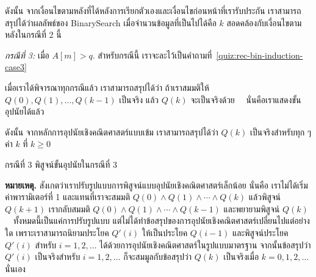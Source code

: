 ดังนั้น จาก{\wbr}เงื่อนไข{\wbr}ตาม{\wbr}หลัง{\wbr}ที่{\wbr}ได้{\wbr}หลัง{\wbr}การ{\wbr}เรียก{\wbr}ตัวเอง{\wbr}และ{\wbr}เงื่อนไข{\wbr}ก่อนหน้า{\wbr}ที่{\wbr}เรา{\wbr}รับประกัน{\wbr}
เรา{\wbr}สามารถ{\wbr}สรุป{\wbr}ได้{\wbr}ว่า{\wbr}ผลลัพธ์{\wbr}ของ BinarySearch เมื่อ{\wbr}จำนวน{\wbr}ข้อมูล{\wbr}ที่{\wbr}เป็น{\wbr}ไป{\wbr}ได้{\wbr}คือ $k$
สอดคล้อง{\wbr}กับ{\wbr}เงื่อนไข{\wbr}ตาม{\wbr}หลัง{\wbr}ใน{\wbr}กรณี{\wbr}ที่ 2 นี้{\wbr}

{\em กรณี{\wbr}ที่ 3:} เมื่อ $A[m]>q$. สำหรับ{\wbr}กรณี{\wbr}นี้{\wbr}
เรา{\wbr}จะ{\wbr}ละ{\wbr}ไว้{\wbr}เป็น{\wbr}คำถาม{\wbr}ที่~\ref{quiz:rec-bin-induction-case3}

เมื่อ{\wbr}เรา{\wbr}ได้{\wbr}พิจารณา{\wbr}ทุก{\wbr}กรณี{\wbr}แล้ว เรา{\wbr}สามารถ{\wbr}สรุป{\wbr}ได้{\wbr}ว่า ถ้า{\wbr}เรา{\wbr}สมมติ{\wbr}ให้{\wbr}
$Q(0),Q(1),\ldots,Q(k-1)$ เป็นจริง แล้ว $Q(k)$ จะ{\wbr}เป็นจริง{\wbr}ด้วย{\wbr}
\ \ นั่น{\wbr}คือ{\wbr}เรา{\wbr}แสดง{\wbr}ขั้น{\wbr}อุปนัย{\wbr}ได้{\wbr}แล้ว{\wbr}

ดังนั้น จาก{\wbr}หลักการ{\wbr}อุปนัย{\wbr}เชิง{\wbr}คณิตศาสตร์{\wbr}แบบ{\wbr}เข้ม เรา{\wbr}สามารถ{\wbr}สรุป{\wbr}ได้{\wbr}ว่า $Q(k)$
เป็นจริง{\wbr}สำหรับ{\wbr}ทุก ๆ ค่า $k$ ที่ $k\geq 0$

\begin{quiz}{กรณี{\wbr}ที่ 3}
\label{quiz:rec-bin-induction-case3} พิสูจน์{\wbr}ขั้น{\wbr}อุปนัย{\wbr}ใน{\wbr}กรณี{\wbr}ที่ 3
\end{quiz}

{\bf หมายเหตุ.}  สังเกต{\wbr}ว่า{\wbr}เรา{\wbr}ปรับ{\wbr}รูปแบบ{\wbr}การ{\wbr}พิสูจน์{\wbr}แบบ{\wbr}อุปนัย{\wbr}เชิง{\wbr}คณิตศาสตร์{\wbr}เล็กน้อย นั่น{\wbr}คือ{\wbr}
เรา{\wbr}ไม่{\wbr}ได้{\wbr}เริ่ม{\wbr}ค่า{\wbr}พารามิเตอร์{\wbr}ที่ 1 และ{\wbr}แทน{\wbr}ที่{\wbr}เรา{\wbr}จะ{\wbr}สมมติ $Q(0)\wedge
Q(1)\wedge\cdots\wedge Q(k)$ แล้ว{\wbr}พิสูจน์ $Q(k+1)$ เรา{\wbr}กลับ{\wbr}สมมติ $Q(0)\wedge
Q(1)\wedge\cdots\wedge Q(k-1)$ และ{\wbr}พยายาม{\wbr}พิสูจน์ $Q(k)$
\ \ ทั้งหมด{\wbr}นี้{\wbr}เป็น{\wbr}แค่{\wbr}การ{\wbr}ปรับ{\wbr}รูปแบบ{\wbr}
แต่{\wbr}ไม่{\wbr}ได้{\wbr}ทำ{\wbr}ข้อสรุป{\wbr}ของ{\wbr}การ{\wbr}อุปนัย{\wbr}เชิง{\wbr}คณิตศาสตร์{\wbr}เปลี่ยน{\wbr}ไป{\wbr}แต่อย่างใด{\wbr}
เพราะ{\wbr}เรา{\wbr}สามารถ{\wbr}นิยาม{\wbr}ประโยค $Q'(i)$ ให้{\wbr}เป็น{\wbr}ประโยค $Q(i-1)$ และ{\wbr}พิสูจน์{\wbr}ประโยค{\wbr}
$Q'(i)$ สำหรับ $i=1,2,\ldots$ ได้{\wbr}ด้วย{\wbr}การ{\wbr}อุปนัย{\wbr}เชิง{\wbr}คณิตศาสตร์{\wbr}ใน{\wbr}รูปแบบมาตรฐาน{\wbr}
จากนั้น{\wbr}ข้อสรุป{\wbr}ว่า $Q'(i)$ เป็นจริง{\wbr}สำหรับ $i=1,2,\ldots$ ก็{\wbr}จะ{\wbr}สม{\wbr}มูล{\wbr}กับ{\wbr}ข้อสรุป{\wbr}ว่า{\wbr}
$Q(k)$ เป็นจริง{\wbr}เมื่อ $k=0,1,2,\ldots$ นั่นเอง{\wbr}

